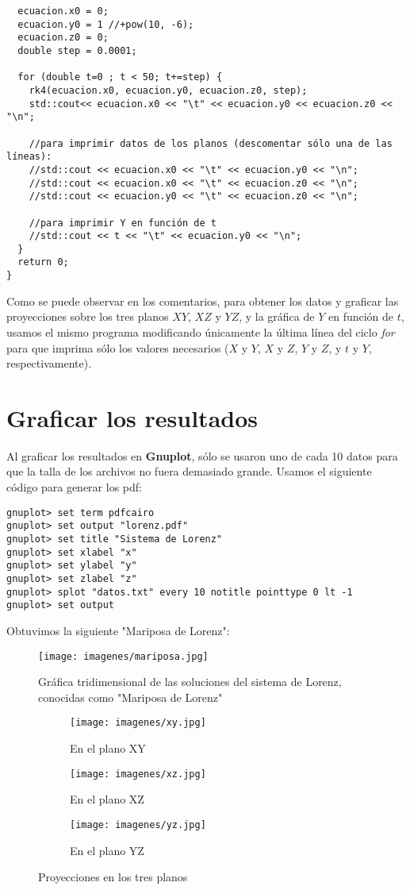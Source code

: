 \documentclass[letterpaper, 12pt]{article}
\begin{document}
{\begin{lstlisting}
  ecuacion.x0 = 0;
  ecuacion.y0 = 1 //+pow(10, -6);
  ecuacion.z0 = 0;
  double step = 0.0001;
  
  for (double t=0 ; t < 50; t+=step) {
    rk4(ecuacion.x0, ecuacion.y0, ecuacion.z0, step);
    std::cout<< ecuacion.x0 << "\t" << ecuacion.y0 << ecuacion.z0 << "\n";

    //para imprimir datos de los planos (descomentar sólo una de las líneas):
    //std::cout << ecuacion.x0 << "\t" << ecuacion.y0 << "\n";
    //std::cout << ecuacion.x0 << "\t" << ecuacion.z0 << "\n";
    //std::cout << ecuacion.y0 << "\t" << ecuacion.z0 << "\n";

    //para imprimir Y en función de t
    //std::cout << t << "\t" << ecuacion.y0 << "\n"; 
  }  
  return 0;
}
\end{lstlisting}

Como se puede observar en los comentarios, para obtener los datos y graficar las proyecciones sobre los tres planos $XY$, $XZ$ y $YZ$, y la gr\'afica de $Y$ en funci\'on de $t$, usamos el mismo programa modificando \'unicamente la \'ultima l\'inea del ciclo \textit{for} para que imprima s\'olo los valores necesarios ($X$ y $Y$, $X$ y $Z$, $Y$ y $Z$, y $t$ y $Y$, respectivamente).


\section*{Graficar los resultados}

\justify
Al graficar los resultados en \textbf{Gnuplot}, s\'olo se usaron uno de cada 10 datos para que la talla de los archivos no fuera demasiado grande. Usamos el siguiente c\'odigo para generar los pdf:
\lstset{language =}
\begin{lstlisting}
gnuplot> set term pdfcairo
gnuplot> set output "lorenz.pdf"
gnuplot> set title "Sistema de Lorenz"
gnuplot> set xlabel "x"
gnuplot> set ylabel "y"
gnuplot> set zlabel "z"
gnuplot> splot "datos.txt" every 10 notitle pointtype 0 lt -1
gnuplot> set output
\end{lstlisting}

Obtuvimos la siguiente "Mariposa de Lorenz":
\clearpage

\begin{figure} [!htbp]
\centering
\texttt{[image: imagenes/mariposa.jpg]}
\caption{Gr\'afica tridimensional de las soluciones del sistema de Lorenz, conocidas como "Mariposa de Lorenz"}

\begin{subfigure}{0.31\textwidth}
\texttt{[image: imagenes/xy.jpg]}
\caption{En el plano XY}
\end{subfigure}
\begin{subfigure}{0.31\textwidth}
\texttt{[image: imagenes/xz.jpg]}
\caption{En el plano XZ}
\end{subfigure}
\begin{subfigure}{0.31\textwidth}
\texttt{[image: imagenes/yz.jpg]}
\caption{En el plano YZ}
\end{subfigure}
\caption{Proyecciones en los tres planos}
\end{figure}


}
\end{document}
